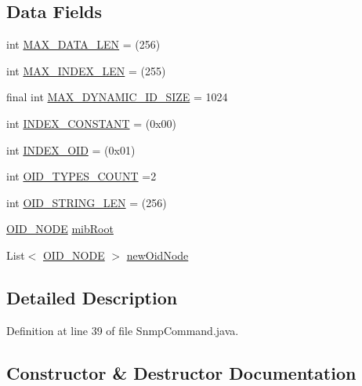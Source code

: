\subsection*{Data Fields}
\begin{DoxyCompactItemize}
\item 
int \hyperlink{classmib2bib_1_1_snmp_command_a8bf590fdaf2b987465809f72d0ad15cc}{M\+A\+X\+\_\+\+D\+A\+T\+A\+\_\+\+L\+E\+N} = (256)
\item 
int \hyperlink{classmib2bib_1_1_snmp_command_abcb90095a6636ca389b48b8d82756242}{M\+A\+X\+\_\+\+I\+N\+D\+E\+X\+\_\+\+L\+E\+N} = (255)
\item 
final int \hyperlink{classmib2bib_1_1_snmp_command_a176a73971fb20f7f214343d875883ec4}{M\+A\+X\+\_\+\+D\+Y\+N\+A\+M\+I\+C\+\_\+\+I\+D\+\_\+\+S\+I\+Z\+E} = 1024
\item 
int \hyperlink{classmib2bib_1_1_snmp_command_a65f9013e44c2730a0458966da41fdd24}{I\+N\+D\+E\+X\+\_\+\+C\+O\+N\+S\+T\+A\+N\+T} = (0x00)
\item 
int \hyperlink{classmib2bib_1_1_snmp_command_a2bc36a7fc9861453ea420fc1f7d9928f}{I\+N\+D\+E\+X\+\_\+\+O\+I\+D} = (0x01)
\item 
int \hyperlink{classmib2bib_1_1_snmp_command_ae1cc74c574312b077952eec6a54e1b53}{O\+I\+D\+\_\+\+T\+Y\+P\+E\+S\+\_\+\+C\+O\+U\+N\+T} =2
\item 
int \hyperlink{classmib2bib_1_1_snmp_command_a98b77d9b2f08e98797d6d1d5a2c7c670}{O\+I\+D\+\_\+\+S\+T\+R\+I\+N\+G\+\_\+\+L\+E\+N} = (256)
\item 
\hyperlink{classmib2bib_1_1_snmp_command_1_1_o_i_d___n_o_d_e}{O\+I\+D\+\_\+\+N\+O\+D\+E} \hyperlink{classmib2bib_1_1_snmp_command_ad251b1bd4e932206794577ca25d7aeb5}{mib\+Root}
\item 
List$<$ \hyperlink{classmib2bib_1_1_snmp_command_1_1_o_i_d___n_o_d_e}{O\+I\+D\+\_\+\+N\+O\+D\+E} $>$ \hyperlink{classmib2bib_1_1_snmp_command_ac637b8dd3e1ddbb157f3824e1af6df1e}{new\+Oid\+Node}
\end{DoxyCompactItemize}


\subsection{Detailed Description}


Definition at line 39 of file Snmp\+Command.\+java.



\subsection{Constructor \& Destructor Documentation}
\hypertarget{classmib2bib_1_1_snmp_command_a2314151510e1182c341ce663ceabdd34}{}
